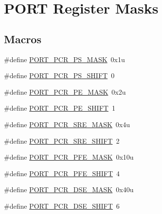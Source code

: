 \hypertarget{group___p_o_r_t___register___masks}{}\section{P\+O\+RT Register Masks}
\label{group___p_o_r_t___register___masks}
\subsection*{Macros}
\begin{DoxyCompactItemize}
\item 
\#define \hyperlink{group___p_o_r_t___register___masks_ga075e53298ec26cb1b463c95b902c39c1}{P\+O\+R\+T\+\_\+\+P\+C\+R\+\_\+\+P\+S\+\_\+\+M\+A\+SK}~0x1u
\item 
\#define \hyperlink{group___p_o_r_t___register___masks_ga7c040fa4d37750af5fef3ea1d0e370a9}{P\+O\+R\+T\+\_\+\+P\+C\+R\+\_\+\+P\+S\+\_\+\+S\+H\+I\+FT}~0
\item 
\#define \hyperlink{group___p_o_r_t___register___masks_ga125482aa2497e8435dac49c039b7fa97}{P\+O\+R\+T\+\_\+\+P\+C\+R\+\_\+\+P\+E\+\_\+\+M\+A\+SK}~0x2u
\item 
\#define \hyperlink{group___p_o_r_t___register___masks_ga18556773988cdd78e363959884dbec46}{P\+O\+R\+T\+\_\+\+P\+C\+R\+\_\+\+P\+E\+\_\+\+S\+H\+I\+FT}~1
\item 
\#define \hyperlink{group___p_o_r_t___register___masks_ga9cdf02a7b160ee528de8e18aad2cae60}{P\+O\+R\+T\+\_\+\+P\+C\+R\+\_\+\+S\+R\+E\+\_\+\+M\+A\+SK}~0x4u
\item 
\#define \hyperlink{group___p_o_r_t___register___masks_ga87657ecdc18eb5b344d4e399a3a2fb70}{P\+O\+R\+T\+\_\+\+P\+C\+R\+\_\+\+S\+R\+E\+\_\+\+S\+H\+I\+FT}~2
\item 
\#define \hyperlink{group___p_o_r_t___register___masks_ga7f1f5c3812018f9ed4d84a187146ba91}{P\+O\+R\+T\+\_\+\+P\+C\+R\+\_\+\+P\+F\+E\+\_\+\+M\+A\+SK}~0x10u
\item 
\#define \hyperlink{group___p_o_r_t___register___masks_gae7d057ebd3218784fca57f55a85f2d29}{P\+O\+R\+T\+\_\+\+P\+C\+R\+\_\+\+P\+F\+E\+\_\+\+S\+H\+I\+FT}~4
\item 
\#define \hyperlink{group___p_o_r_t___register___masks_gae1c37b9f66e58bd80e7764232fd05cee}{P\+O\+R\+T\+\_\+\+P\+C\+R\+\_\+\+D\+S\+E\+\_\+\+M\+A\+SK}~0x40u
\item 
\#define \hyperlink{group___p_o_r_t___register___masks_ga00ae08038ade5432d0240666658d8867}{P\+O\+R\+T\+\_\+\+P\+C\+R\+\_\+\+D\+S\+E\+\_\+\+S\+H\+I\+FT}~6
\item 

\end{DoxyCompactItemize}

